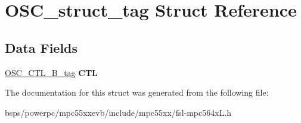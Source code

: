 \hypertarget{structOSC__struct__tag}{}\section{O\+S\+C\+\_\+struct\+\_\+tag Struct Reference}
\label{structOSC__struct__tag}
\subsection*{Data Fields}
\begin{DoxyCompactItemize}
\item 
\mbox{\label{structOSC__struct__tag_a513166e64e58829c77152e845a5edbf4}} 
\mbox{\hyperlink{unionOSC__CTL__32B__tag}{O\+S\+C\+\_\+\+C\+T\+L\+\_\+B\+\_\+tag}} {\bfseries C\+TL}
\end{DoxyCompactItemize}


The documentation for this struct was generated from the following file\+:\begin{DoxyCompactItemize}
\item 
bsps/powerpc/mpc55xxevb/include/mpc55xx/fsl-\/mpc564x\+L.\+h\end{DoxyCompactItemize}
